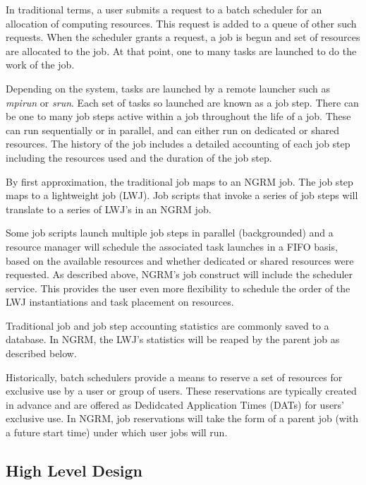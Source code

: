 \documentclass{article}
\begin{document}
In traditional terms, a user submits a request to a batch scheduler
for an allocation of computing resources.  This request is added to a
queue of other such requests.  When the scheduler grants a request, a
job is begun and set of resources are allocated to the job.  At that
point, one to many tasks are launched to do the work of the job.

Depending on the system, tasks are launched by a remote launcher such
as {\em mpirun} or {\em srun}.  Each set of tasks so launched are
known as a job step.  There can be one to many job steps active within
a job throughout the life of a job.  These can run sequentially or in
parallel, and can either run on dedicated or shared resources.  The
history of the job includes a detailed accounting of each job step
including the resources used and the duration of the job step.

By first approximation, the traditional job maps to an NGRM job.  The
job step maps to a lightweight job (LWJ).  Job scripts that invoke a
series of job steps will translate to a series of LWJ's in an NGRM
job.

Some job scripts launch multiple job steps in parallel (backgrounded)
and a resource manager will schedule the associated task launches in a
FIFO basis, based on the available resources and whether dedicated or
shared resources were requested.  As described above, NGRM's job
construct will include the scheduler service.  This provides the user
even more flexibility to schedule the order of the LWJ instantiations
and task placement on resources.

Traditional job and job step accounting statistics are commonly saved
to a database.  In NGRM, the LWJ's statistics will be reaped by the
parent job as described below.

Historically, batch schedulers provide a means to reserve a set of
resources for exclusive use by a user or group of users.  These
reservations are typically created in advance and are offered as
Dedidcated Application Times (DATs) for users' exclusive use.  In
NGRM, job reservations will take the form of a parent job (with a
future start time) under which user jobs will run.

\subsection{High Level Design}
\end{document}

